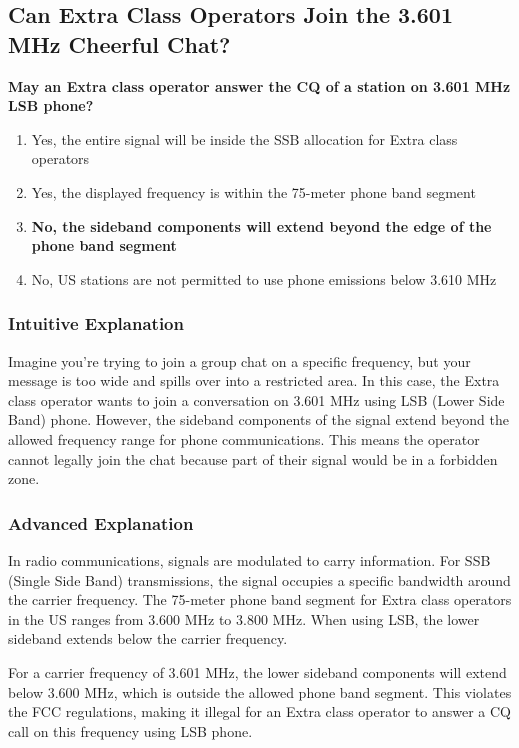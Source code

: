 \subsection{Can Extra Class Operators Join the 3.601 MHz Cheerful Chat?}

\begin{tcolorbox}[colback=gray!10!white,colframe=black!75!black,title=\textbf{E1A04}]
\textbf{May an Extra class operator answer the CQ of a station on 3.601 MHz LSB phone?}
\begin{enumerate}[label=\Alph*.]
    \item Yes, the entire signal will be inside the SSB allocation for Extra class operators
    \item Yes, the displayed frequency is within the 75-meter phone band segment
    \item \textbf{No, the sideband components will extend beyond the edge of the phone band segment}
    \item No, US stations are not permitted to use phone emissions below 3.610 MHz
\end{enumerate}
\end{tcolorbox}

\subsubsection{Intuitive Explanation}
Imagine you're trying to join a group chat on a specific frequency, but your message is too wide and spills over into a restricted area. In this case, the Extra class operator wants to join a conversation on 3.601 MHz using LSB (Lower Side Band) phone. However, the sideband components of the signal extend beyond the allowed frequency range for phone communications. This means the operator cannot legally join the chat because part of their signal would be in a forbidden zone.

\subsubsection{Advanced Explanation}
In radio communications, signals are modulated to carry information. For SSB (Single Side Band) transmissions, the signal occupies a specific bandwidth around the carrier frequency. The 75-meter phone band segment for Extra class operators in the US ranges from 3.600 MHz to 3.800 MHz. When using LSB, the lower sideband extends below the carrier frequency.

For a carrier frequency of 3.601 MHz, the lower sideband components will extend below 3.600 MHz, which is outside the allowed phone band segment. This violates the FCC regulations, making it illegal for an Extra class operator to answer a CQ call on this frequency using LSB phone.

